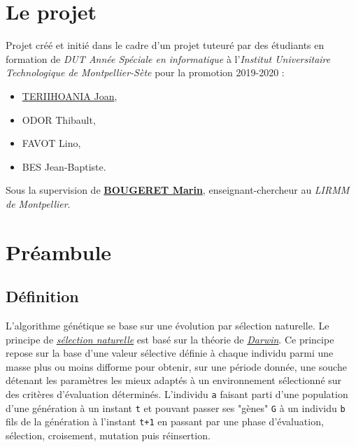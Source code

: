 \hypertarget{le-projet}{%
\section{Le projet}\label{le-projet}}

Projet créé et initié dans le cadre d'un projet tuteuré par des
étudiants en formation de \emph{DUT Année Spéciale en informatique} à
l'\emph{Institut Universitaire Technologique de Montpellier-Sète} pour
la promotion 2019-2020 :

\begin{itemize}
\tightlist
\item
  \href{http://joan-teriihoania.fr/}{TERIIHOANIA Joan},
\item
  ODOR Thibault,
\item
  FAVOT Lino,
\item
  BES Jean-Baptiste.
\end{itemize}

Sous la supervision de
\textbf{\href{http://www.lirmm.fr/~bougeret/}{BOUGERET Marin}},
enseignant-chercheur au \emph{LIRMM de Montpellier}.

\hypertarget{pruxe9ambule}{%
\section{Préambule}\label{pruxe9ambule}}

\hypertarget{duxe9finition}{%
\subsection{Définition}\label{duxe9finition}}

L'algorithme génétique se base sur une évolution par sélection
naturelle. Le principe de
\emph{\href{https://fr.wikipedia.org/wiki/S\%C3\%A9lection_naturelle}{sélection
naturelle}} est basé sur la théorie de
\emph{\href{https://fr.wikipedia.org/wiki/Charles_Darwin}{Darwin}}. Ce
principe repose sur la base d'une valeur sélective définie à chaque
individu parmi une masse plus ou moins difforme pour obtenir, sur une
période donnée, une souche détenant les paramètres les mieux adaptés à
un environnement sélectionné sur des critères d'évaluation déterminés.
L'individu \texttt{a} faisant parti d'une population d'une génération à
un instant \texttt{t} et pouvant passer ses "gènes" \texttt{G} à un
individu \texttt{b} fils de la génération à l'instant \texttt{t+1} en
passant par une phase d'évaluation, sélection, croisement, mutation puis
réinsertion.

